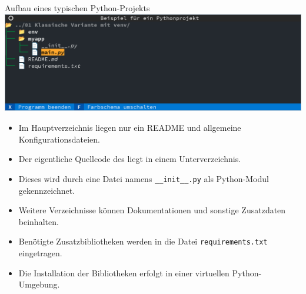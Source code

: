 {
\scriptsize

\begin{frame}{Aufbau eines typischen Python-Projekts}
    \includegraphics[width=\textwidth]{img/verzeichnisse-venv}
    \smallskip


    \begin{itemize}
        \item Im Hauptverzeichnis liegen nur ein README und allgemeine Konfigurationsdateien.
        \item Der eigentliche Quellcode des liegt in einem Unterverzeichnis.
        \item Dieses wird durch eine Datei namens \texttt{\_\_init\_\_.py} als Python-Modul gekennzeichnet.
        \item Weitere Verzeichnisse können Dokumentationen und sonstige Zusatzdaten beinhalten.
        \item Benötigte Zusatzbibliotheken werden in die Datei \texttt{requirements.txt} eingetragen.
        \item Die Installation der Bibliotheken erfolgt in einer virtuellen Python-Umgebung.
    \end{itemize}
\end{frame}
}

